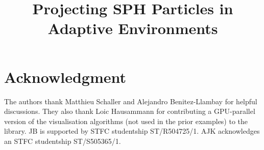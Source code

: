 \documentclass[a4paper,conference]{IEEEtran}
\begin{document}
\title{Projecting SPH Particles in Adaptive Environments}


\author{
}


\maketitle

\begin{abstract}

\end{abstract}








\section*{Acknowledgment}
The authors thank Matthieu Schaller and Alejandro Benitez-Llambay for helpful discussions.
They also thank Loic Hausammann for contributing a GPU-parallel version of the visualisation algorithms (not used in the prior examples) to the library.
JB is supported by STFC studentship ST/R504725/1.
AJK acknowledges an STFC studentship ST/S505365/1.



\vspace{3.5mm}


%

\end{document}
